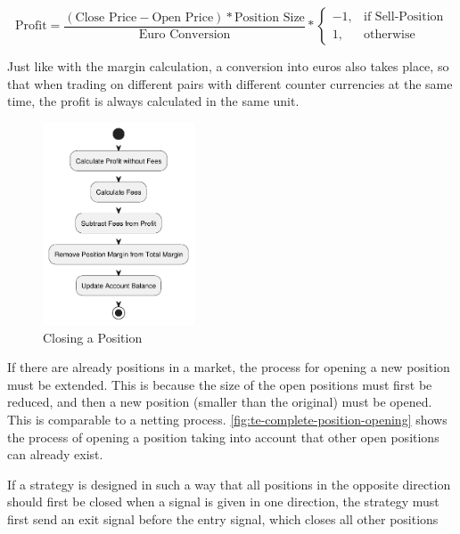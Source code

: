 \[
    \text{Profit} = \frac{(\text{Close Price} - \text{Open Price}) * \text{Position Size}}{\text{Euro Conversion}} *
    \begin{cases}
        -1,& \text{if Sell-Position}\\
        1,              & \text{otherwise}
    \end{cases}
\]

\noindent
Just like with the margin calculation, a conversion into euros also takes place, so that when trading on different pairs with different counter currencies at the same time, the profit is always calculated in the same unit.

\begin{figure}[H]
    \centering
    \includegraphics[width=0.4\textwidth]{images/trading-engine/position-closing}
    \caption{Closing a Position}
    \label{fig:te-position-closing}
\end{figure}

\noindent
If there are already positions in a market, the process for opening a new position must be extended.
This is because the size of the open positions must first be reduced, and then a new position (smaller than the original) must be opened.
This is comparable to a netting process.
\autoref{fig:te-complete-position-opening} shows the process of opening a position taking into account that other open positions can already exist.

If a strategy is designed in such a way that all positions in the opposite direction should first be closed when a signal is given in one direction, the strategy must first send an exit signal before the entry signal, which closes all other positions


